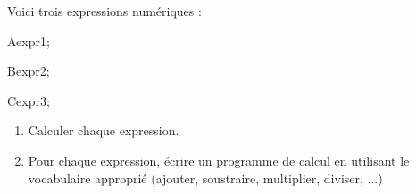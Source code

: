 \documentclass[exercice]{thedocument}%
\begin{document}
%
Voici trois expressions numériques :\par\bigskip
A\<expr1;\par\smallskip
B\<expr2;\par\smallskip
C\<expr3;
\begin{enumerate}
    \item Calculer chaque expression.
    \item Pour chaque expression, écrire un programme de calcul en
    utilisant le vocabulaire approprié (ajouter, soustraire, multiplier,
    diviser, ...)
\end{enumerate}
\end{document}
